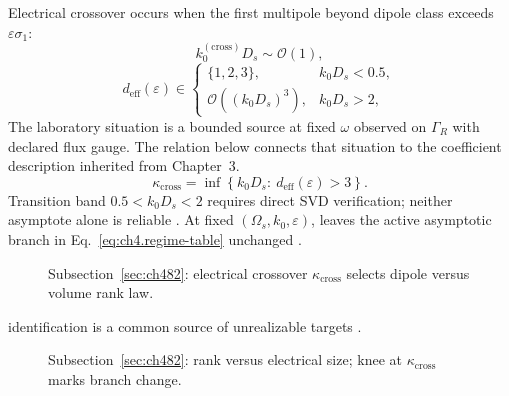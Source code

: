 Electrical crossover occurs when the first multipole beyond dipole class exceeds \(\varepsilon\sigma_{1}\):
\begin{equation}
\label{eq:ch4.crossover-frequency}
k_{0}^{(\mathrm{cross})}D_{s}\sim\mathcal{O}(1),
\end{equation}
\begin{equation}
\label{eq:ch4.regime-table}
d_{\mathrm{eff}}(\varepsilon)\in\begin{cases}\{1,2,3\}, & k_{0}D_{s}<0.5,\\ \mathcal{O}((k_{0}D_{s})^{3}), & k_{0}D_{s}>2,\end{cases}
\end{equation}
The laboratory situation is a bounded source at fixed $\omega$ observed on $\Gamma_R$ with declared flux gauge. The relation below connects that situation to the coefficient description inherited from Chapter~3. \cite{stratton1941}
\begin{equation}
\label{eq:ch4.crossover-knee}
\kappa_{\mathrm{cross}}=\inf\left\{k_{0}D_{s}:\ d_{\mathrm{eff}}(\varepsilon)>3\right\}.
\end{equation}
Transition band \(0.5<k_{0}D_{s}<2\) requires direct SVD verification; neither asymptote alone is reliable \cite{hansen1988}.
\label{lem:ch4.phase-asymptote}
At fixed \((\Omega_{s},k_{0},\varepsilon)\), leaves the active asymptotic branch in Eq.~\eqref{eq:ch4.regime-table} unchanged
\cite{devaney2004}.
\begin{figure}[t]
\centering
{}
\caption{Subsection~\ref{sec:ch482}: electrical crossover \(\kappa_{\mathrm{cross}}\) selects dipole versus volume rank law.}
\label{fig:ch4.asymptotic-crossover}
\end{figure}
identification is a common source of unrealizable targets \cite{jackson1999}.
\begin{figure}[t]
\centering
{}
\caption{Subsection~\ref{sec:ch482}: rank versus electrical size; knee at \(\kappa_{\mathrm{cross}}\) marks branch change.}
\label{fig:ch4.rank-vs-kds}
\end{figure}
